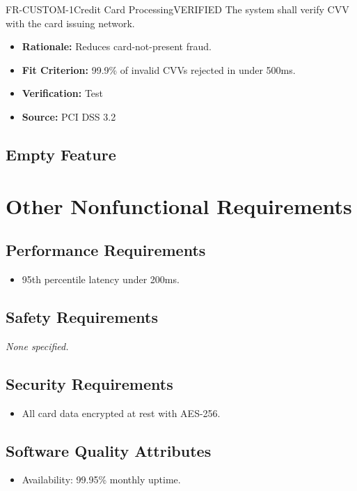 \documentclass[11pt,a4paper]{article}
\begin{document}
\begin{requirementbox}{FR-CUSTOM-1}{Credit Card Processing}{VERIFIED}
The system shall verify CVV with the card issuing network.
\begin{itemize}[leftmargin=*,itemsep=2pt,topsep=4pt]
    \item \textbf{Rationale:} Reduces card-not-present fraud.
    \item \textbf{Fit Criterion:} 99.9\% of invalid CVVs rejected in under 500ms.
    \item \textbf{Verification:} Test
    \item \textbf{Source:} PCI DSS 3.2
\end{itemize}
\end{requirementbox}

\subsection{Empty Feature}
\section{Other Nonfunctional Requirements}
\subsection{Performance Requirements}
\begin{itemize}[leftmargin=*]
    \item 95th percentile latency under 200ms.
\end{itemize}

\subsection{Safety Requirements}
\textit{None specified.}\par\vspace{6pt}
\subsection{Security Requirements}
\begin{itemize}[leftmargin=*]
    \item All card data encrypted at rest with AES-256.
\end{itemize}

\subsection{Software Quality Attributes}
\begin{itemize}[leftmargin=*]
    \item Availability: 99.95\% monthly uptime.
\end{itemize}
\end{document}
